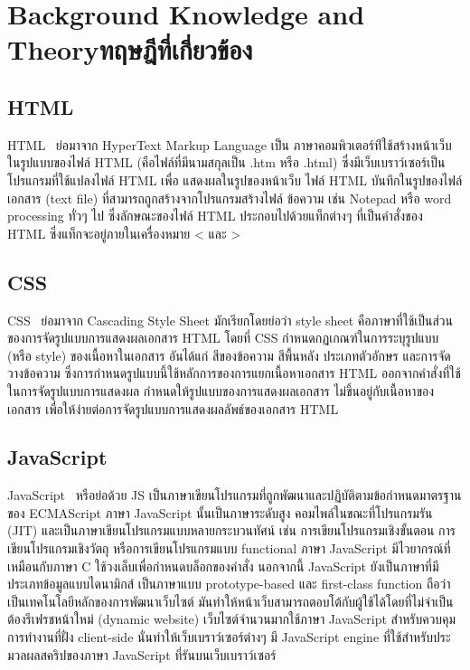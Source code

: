 \chapter{\ifenglish Background Knowledge and Theory\else ทฤษฎีที่เกี่ยวข้อง\fi}


\section{HTML}
HTML~\cite{HTML} ย่อมาจาก HyperText Markup Language เป็น ภาษาคอมพิวเตอร์ท่ีใช้สร้างหน้าเว็บในรูปแบบของไฟล์ HTML (คือไฟล์ที่มีนามสกุลเป็น .htm หรือ .html) ซึ่งมีเว็บเบราว์เซอร์เป็นโปรแกรมที่ใช้แปลงไฟล์ HTML เพื่อ แสดงผลในรูปของหน้าเว็บ
ไฟล์ HTML บันทึกในรูปของไฟล์เอกสาร (text file) ที่สามารถถูกสร้างจากโปรแกรมสร้างไฟล์ ข้อความ เช่น Notepad หรือ word processing ทั่วๆ ไป ซึ่งลักษณะของไฟล์ HTML ประกอบไปด้วยแท็กต่างๆ ที่เป็นคำสั่งของ HTML ซึ่งแท็กจะอยู่ภายในเครื่องหมาย < และ >

\section{CSS}
CSS~\cite{CSS} ย่อมาจาก Cascading Style Sheet  มักเรียกโดยย่อว่า style sheet คือภาษาที่ใช้เป็นส่วนของการจัดรูปแบบการแสดงผลเอกสาร  HTML โดยที่ CSS กำหนดกฏเกณฑ์ในการระบุรูปแบบ (หรือ style) ของเนื้อหาในเอกสาร 
อันได้แก่ สีของข้อความ สีพื้นหลัง ประเภทตัวอักษร และการจัดวางข้อความ ซึ่งการกำหนดรูปแบบนี้ใช้หลักการของการแยกเนื้อหาเอกสาร HTML ออกจากคำสั่งที่ใช้ในการจัดรูปแบบการแสดงผล กำหนดให้รูปแบบของการแสดงผลเอกสาร 
ไม่ขึ้นอยู่กับเนื้อหาของเอกสาร เพื่อให้ง่ายต่อการจัดรูปแบบการแสดงผลลัพธ์ของเอกสาร HTML

\section{JavaScript}
JavaScript~\cite{JavaScript} หรือย่อด้วย JS เป็นภาษาเขียนโปรแกรมที่ถูกพัฒนาและปฏิบัติตามข้อกำหนดมาตรฐานของ ECMAScript
ภาษา JavaScript นั้นเป็นภาษาระดับสูง คอมไพล์ในขณะที่โปรแกรมรัน (JIT) และเป็นภาษาเขียนโปรแกรมแบบหลายกระบวนทัศน์ เช่น การเขียนโปรแกรมเชิงขั้นตอน การเขียนโปรแกรมเชิงวัตถุ หรือการเขียนโปรแกรมแบบ functional 
ภาษา JavaScript มีไวยากรณ์ที่เหมือนกับภาษา C ใช้วงเล็บเพื่อกำหนดบล็อกของคำสั่ง นอกจากนี้ JavaScript ยังเป็นภาษาที่มีประเภทข้อมูลแบบไดนามิกส์ เป็นภาษาแบบ prototype-based และ first-class function
%
ถือว่าเป็นเทคโนโลยีหลักของการพัฒนาเว็บไซต์ มันทำให้หน้าเว็บสามารถตอบโต้กับผู้ใช้ได้โดยที่ไม่จำเป็นต้องรีเฟรชหน้าใหม่ (dynamic website) เว็บไซต์จำนวนมากใช้ภาษา JavaScript 
สำหรับควบคุมการทำงานที่ฝั่ง client-side นั่นทำให้เว็บเบราว์เซอร์ต่างๆ มี JavaScript engine ที่ใช้สำหรับประมวลผลสคริปของภาษา JavaScript ที่รันบนเว็บเบราว์เซอร์

